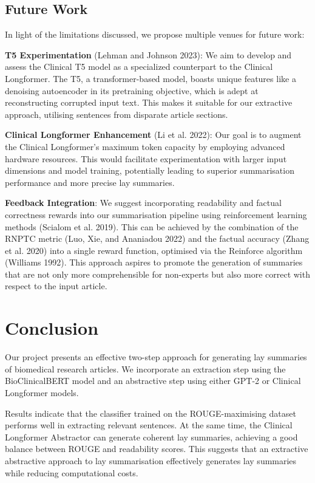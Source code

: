 \documentclass[
]{article}
\begin{document}
\hypertarget{sec:future-work}{%
\subsection{Future Work}\label{sec:future-work}}

In light of the limitations discussed, we propose multiple venues for
future work:

\textbf{T5 Experimentation} (Lehman and Johnson 2023): We aim to develop
and assess the Clinical T5 model as a specialized counterpart to the
Clinical Longformer. The T5, a transformer-based model, boasts unique
features like a denoising autoencoder in its pretraining objective,
which is adept at reconstructing corrupted input text. This makes it
suitable for our extractive approach, utilising sentences from disparate
article sections.

\textbf{Clinical Longformer Enhancement} (Li et al. 2022): Our goal is
to augment the Clinical Longformer's maximum token capacity by employing
advanced hardware resources. This would facilitate experimentation with
larger input dimensions and model training, potentially leading to
superior summarisation performance and more precise lay summaries.

\textbf{Feedback Integration}: We suggest incorporating readability and
factual correctness rewards into our summarisation pipeline using
reinforcement learning methods (Scialom et al. 2019). This can be
achieved by the combination of the RNPTC metric (Luo, Xie, and Ananiadou
2022) and the factual accuracy (Zhang et al. 2020) into a single reward
function, optimised via the Reinforce algorithm (Williams 1992). This
approach aspires to promote the generation of summaries that are not
only more comprehensible for non-experts but also more correct with
respect to the input article.

\hypertarget{sec:conclusion}{%
\section{Conclusion}\label{sec:conclusion}}

Our project presents an effective two-step approach for generating lay
summaries of biomedical research articles. We incorporate an extraction
step using the BioClinicalBERT model and an abstractive step using
either GPT-2 or Clinical Longformer models.

Results indicate that the classifier trained on the ROUGE-maximising
dataset performs well in extracting relevant sentences. At the same
time, the Clinical Longformer Abstractor can generate coherent lay
summaries, achieving a good balance between ROUGE and readability
scores. This suggests that an extractive abstractive approach to lay
summarisation effectively generates lay summaries while reducing
computational costs.
\end{document}
